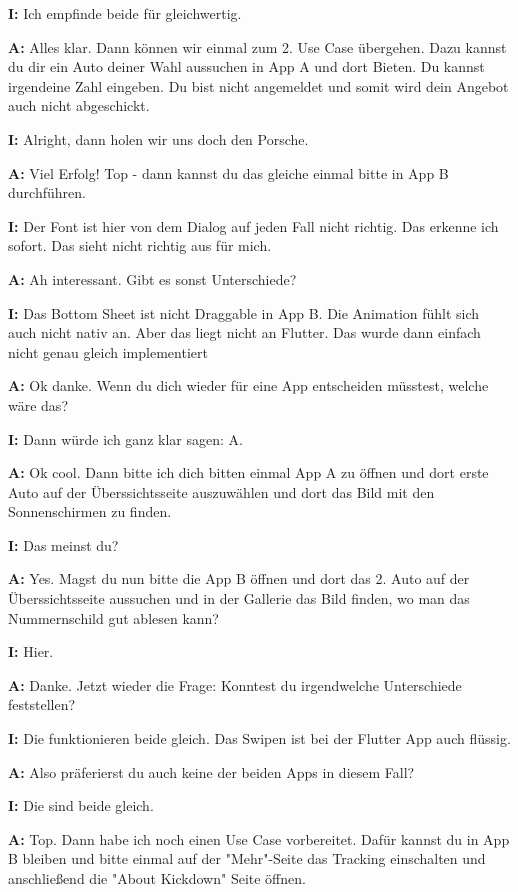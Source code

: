 \begin{myparindent}{0pt}
\textbf{I:} Ich empfinde beide für gleichwertig. 

\textbf{A:} Alles klar. Dann können wir einmal zum 2. Use Case übergehen. Dazu kannst du dir ein Auto deiner Wahl aussuchen in App A und dort Bieten. Du kannst irgendeine Zahl eingeben. Du bist nicht angemeldet und somit wird dein Angebot auch nicht abgeschickt.

\textbf{I:} Alright, dann holen wir uns doch den Porsche. 

\textbf{A:} Viel Erfolg! Top - dann kannst du das gleiche einmal bitte in App B durchführen. 

\textbf{I:} Der Font ist hier von dem Dialog auf jeden Fall nicht richtig. Das erkenne ich sofort. Das sieht nicht richtig aus für mich. 

\textbf{A:} Ah interessant. Gibt es sonst Unterschiede?

\textbf{I:} Das Bottom Sheet ist nicht Draggable in App B. Die Animation fühlt sich auch nicht nativ an. Aber das liegt nicht an Flutter. Das wurde dann einfach nicht genau gleich implementiert

\textbf{A:} Ok danke. Wenn du dich wieder für eine App entscheiden müsstest, welche wäre das?

\textbf{I:} Dann würde ich ganz klar sagen: A. 

\textbf{A:} Ok cool. Dann bitte ich dich bitten einmal App A zu öffnen und dort erste Auto auf der Überssichtsseite auszuwählen und dort das Bild mit den Sonnenschirmen zu finden.

\textbf{I:} Das meinst du?

\textbf{A:} Yes. Magst du nun bitte die App B öffnen und dort das 2. Auto auf der Überssichtsseite aussuchen und in der Gallerie das Bild finden, wo man das Nummernschild gut ablesen kann?

\textbf{I:} Hier.

\textbf{A:} Danke. Jetzt wieder die Frage: Konntest du irgendwelche Unterschiede feststellen?

\textbf{I:} Die funktionieren beide gleich. Das Swipen ist bei der Flutter App auch flüssig.

\textbf{A:} Also präferierst du auch keine der beiden Apps in diesem Fall?

\textbf{I:} Die sind beide gleich.

\textbf{A:} Top. Dann habe ich noch einen Use Case vorbereitet. Dafür kannst du in App B bleiben und bitte einmal auf der "Mehr"-Seite das Tracking einschalten und anschließend die "About Kickdown" Seite öffnen. 


\end{myparindent}

